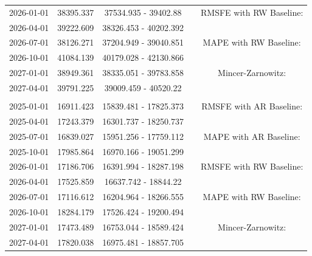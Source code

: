 \begin{table}
\begin{tabular}[t]{ccccc}
\hspace{1em}2026-01-01 & 38395.337 & 37534.935 - 39402.88 &  & RMSFE with RW Baseline:\\
\hspace{1em}2026-04-01 & 39222.609 & 38326.453 - 40202.392 &  & \\
\hspace{1em}2026-07-01 & 38126.271 & 37204.949 - 39040.851 &  & MAPE with RW Baseline:\\
\hspace{1em}2026-10-01 & 41084.139 & 40179.028 - 42130.866 &  & \\
\hspace{1em}2027-01-01 & 38949.361 & 38335.051 - 39783.858 &  & Mincer-Zarnowitz:\\
\hspace{1em}2027-04-01 & 39791.225 & 39009.459 - 40520.22 &  & \\
\addlinespace[0.3em]
\multicolumn{5}{l}{\textbf{RealVAIndustry}}\\
\hspace{1em}2025-01-01 & 16911.423 & 15839.481 - 17825.373 &  & RMSFE with AR Baseline:\\
\hspace{1em}2025-04-01 & 17243.379 & 16301.737 - 18250.737 &  & \\
\hspace{1em}2025-07-01 & 16839.027 & 15951.256 - 17759.112 &  & MAPE with AR Baseline:\\
\hspace{1em}2025-10-01 & 17985.864 & 16970.166 - 19051.299 &  & \\
\hspace{1em}2026-01-01 & 17186.706 & 16391.994 - 18287.198 &  & RMSFE with RW Baseline:\\
\hspace{1em}2026-04-01 & 17525.859 & 16637.742 - 18844.22 &  & \\
\hspace{1em}2026-07-01 & 17116.612 & 16204.964 - 18266.555 &  & MAPE with RW Baseline:\\
\hspace{1em}2026-10-01 & 18284.179 & 17526.424 - 19200.494 &  & \\
\hspace{1em}2027-01-01 & 17473.489 & 16753.044 - 18589.424 &  & Mincer-Zarnowitz:\\
\hspace{1em}2027-04-01 & 17820.038 & 16975.481 - 18857.705 &  & \\
\bottomrule
\end{tabular}
\end{table}

